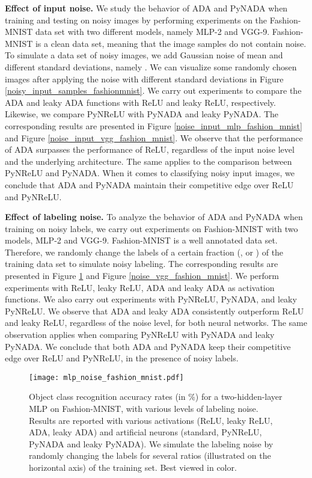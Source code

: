 \documentclass[pdflatex,sn-mathphys]{sn-jnl}
\theoremstyle{thmstyleone}
\theoremstyle{thmstyletwo}\newtheorem{example}{Example}\newtheorem{remark}{Remark}
\theoremstyle{thmstylethree}\newtheorem{definition}{Definition}\DeclareMathOperator{\sinc}{sinc}
\begin{document}
\noindent
{\bf Effect of input noise.}  We study the behavior of ADA and PyNADA when training and testing on noisy images by performing experiments on the Fashion-MNIST data set with two different models, namely MLP-2 and VGG-9. Fashion-MNIST is a clean data set, meaning that the image samples do not contain  noise. To simulate a data set of noisy images, we add Gaussian noise of  mean and different standard deviations, namely . We can visualize some randomly chosen images after applying the noise with different standard deviations in Figure \ref{noisy_input_samples_fashionmnist}. We carry out experiments to compare the ADA and leaky ADA functions with ReLU and leaky ReLU, respectively. Likewise, we compare PyNReLU with PyNADA and leaky PyNADA. The corresponding results are presented in Figure \ref{noise_input_mlp_fashion_mnist} and Figure \ref{noise_input_vgg_fashion_mnist}. We observe that the performance of ADA surpasses the performance of ReLU, regardless of the input noise level and the underlying architecture. The same applies to the comparison between PyNReLU and PyNADA. When it comes to classifying noisy input images, we conclude that ADA and PyNADA maintain their competitive edge over ReLU and PyNReLU.

\noindent
{\bf Effect of labeling noise.} To analyze the behavior of ADA and PyNADA when training on noisy labels, we carry out experiments on Fashion-MNIST with two models, MLP-2 and VGG-9. Fashion-MNIST is a well annotated data set. Therefore, we randomly change the labels of a certain fraction (,  or ) of the training data set to simulate noisy labeling. The corresponding results are presented in Figure \ref{noise_mlp_fashion_mnist} and Figure \ref{noise_vgg_fashion_mnist}. We perform experiments with ReLU, leaky ReLU, ADA and leaky ADA as activation functions. We also carry out experiments with PyNReLU, PyNADA, and leaky PyNReLU. We observe that ADA and leaky ADA consistently outperform ReLU and leaky ReLU, regardless of the noise level, for both neural networks. The same observation applies when comparing PyNReLU with PyNADA and leaky PyNADA. We conclude that both ADA and PyNADA keep their competitive edge over ReLU and PyNReLU, in the presence of noisy labels.

\begin{figure}  
\begin{center}
\centerline{\texttt{[image: mlp\_noise\_fashion\_mnist.pdf]}}
\caption{Object class recognition accuracy rates (in \%) for a two-hidden-layer MLP on Fashion-MNIST, with various levels of labeling noise. Results are reported with various activations (ReLU, leaky ReLU, ADA, leaky ADA) and artificial neurons (standard, PyNReLU, PyNADA and leaky PyNADA). We simulate the labeling noise by randomly changing the labels for several ratios (illustrated on the horizontal axis) of the training set. Best viewed in color.}\label{noise_mlp_fashion_mnist} 
\end{center}
\end{figure}
\end{document}

